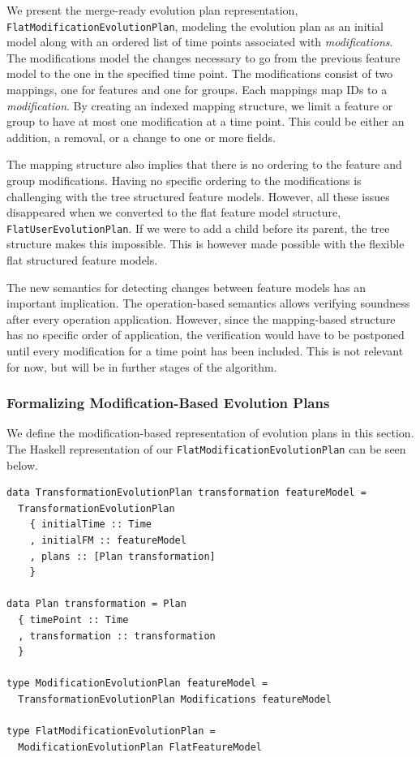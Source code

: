 \documentclass[a4paper,english]{ifimaster}
\begin{document}
We present the merge-ready evolution plan representation, \texttt{Flat\-Modification\-Evolution\-Plan}, modeling the evolution plan as an initial model along with an ordered list of time points associated with \textit{modifications}. The modifications model the changes necessary to go from the previous feature model to the one in the specified time point. The modifications consist of two mappings, one for features and one for groups. Each mappings map IDs to a \textit{modification}. By creating an indexed mapping structure, we limit a feature or group to have at most one modification at a time point. This could be either an addition, a removal, or a change to one or more fields. 

The mapping structure also implies that there is no ordering to the feature and group modifications. Having no specific ordering to the modifications is challenging with the tree structured feature models. However, all these issues disappeared when we converted to the flat feature model structure, \texttt{Flat\-User\-Evolution\-Plan}. If we were to add a child before its parent, the tree structure makes this impossible. This is however made possible with the flexible flat structured feature models.

The new semantics for detecting changes between feature models has an important implication. The operation-based semantics allows verifying soundness after every operation application. However, since the mapping-based structure has no specific order of application, the verification would have to be postponed until every modification for a time point has been included. This is not relevant for now, but will be in further stages of the algorithm.

\subsubsection{Formalizing Modification-Based Evolution Plans}%
\label{ssub:formalizing_modification_based_evolution_plans}

We define the modification-based representation of evolution plans in this section. The Haskell representation of our \texttt{Flat\-Modification\-Evolution\-Plan} can be seen below.

\begin{verbatim}
data TransformationEvolutionPlan transformation featureModel = 
  TransformationEvolutionPlan
    { initialTime :: Time
    , initialFM :: featureModel
    , plans :: [Plan transformation]
    }

data Plan transformation = Plan
  { timePoint :: Time
  , transformation :: transformation
  }

type ModificationEvolutionPlan featureModel = 
  TransformationEvolutionPlan Modifications featureModel

type FlatModificationEvolutionPlan = 
  ModificationEvolutionPlan FlatFeatureModel
\end{verbatim}
\end{document}
